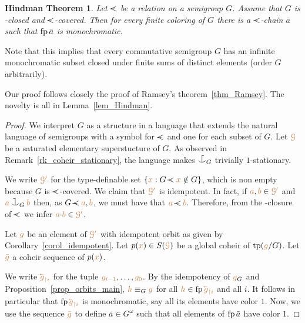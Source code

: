 \documentclass[creche.tex]{subfiles}
\begin{document}
\theoremstyle{mio}
\newtheorem{Hindman}[thm]{Hindman Theorem}
\begin{Hindman}\label{thm_Hindman}
Let $\cpaw$ be a relation on a semigroup $G$.
Assume that $G$ is  \cpawdot-closed and $\cpaw$-covered.
Then for every finite coloring of $G$ 
there is a $\cpaw$-chain $\bar a$ such that ${\rm fp}\,\bar a$ is monochromatic.
\end{Hindman}

Note that this implies that every commutative semigroup $G$ has an infinite monochromatic subset closed under finite sums of distinct elements (order $G$ arbitrarily).

Our proof follows closely the proof of Ramsey's theorem~\ref{thm_Ramsey}.
The novelty is all in Lemma~\ref{lem_Hindman}.

\begin{proof}
We interpret $G$ as a structure in a language 
that extends the natural language of semigroups
with a symbol for $\cpaw$ and one for each subset of $G$.
Let ${\color{brown}\EuScript G}$ be a saturated elementary superstucture of $G$.
As observed in Remark~\ref{rk_coheir_stationary}, 
the language makes $\nonforkc_G$ trivially $1$-stationary.

We write ${\color{brown}\EuScript G'}$ for the type-definable set $\{{\mr x} : G\cpaw{\mr x}\notin G\}$,
which is non empty because $G$ is $\cpaw$-covered.
We claim that ${\color{brown}\EuScript G'}$ is idempotent.
In fact, if ${\color{brown} a},{\color{brown} b}\in{\color{brown}\EuScript G'}$ and ${\mr a}\cnonfork_G{\mr b}$ 
then, as $G\cpaw{\mr a},{\mr b}$, we must have that ${\mr a}\cpaw{\mr b}$.
Therefore, from the \cpawdot-closure of $\cpaw$ we infer ${\color{brown} a}{\cdot}{\color{brown} b}\in{\color{brown}\EuScript G'}$.

Let ${\color{brown} g}$ be an element of ${\color{brown}\EuScript G'}$ with idempotent orbit as given by Corollary~\ref{corol_idempotent}.
Let $p({\color{brown} x})\in S({\color{brown}\EuScript G})$ be a global coheir of ${\rm tp}({\color{brown} g}/G)$.
Let ${\color{brown}\bar g}$ a coheir sequence of $p({\color{brown} x})$.


We write ${\mr \cev{g}_{\restriction i}}$ for the tuple ${\color{brown} g_{i-1}},\dots,{\color{brown} g_{0}}$.
By the idempotency of ${\color{brown} g}_G$ and Proposition~\ref{prop_orbits_main}, 
${\color{brown} h}\equiv_G{\color{brown} g}$ for all ${\mr h}\in \fp\,{\mr \cev{g}_{\restriction i}}$ and all $i$.
It follows in particular that $\fp\,{\mr \cev{g}_{\restriction i}}$ is monochromatic, say all its elements have color $1$.
Now, we use the sequence ${\color{brown}\bar g}$ to define $\bar a\in G^\omega$
such that all elements of ${\rm fp}\,\bar a$ have color $1$.


\end{proof}
\end{document}
